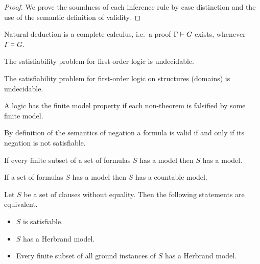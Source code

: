 \begin{proof}
	We prove the soundness of each inference rule by case distinction and the use of the semantic definition of validity.
\end{proof}



\begin{theorem}
	Natural deduction is a complete calculus,
	i.e.~a proof \( \Gamma\vdash G \) exists,
	whenever \( \Gamma\models G \).
\end{theorem}


\begin{theorem}
	The satisfiability problem for first-order logic is undecidable.
\end{theorem}

\begin{theorem}
	The satisfiability problem for first-order logic on  structures (domains) is undecidable.
\end{theorem}

\begin{definition}
	A logic has the finite model property if each non-theorem is falsified by some finite model.
\end{definition}

\begin{lemma}[Refutation]
	By definition of the semantics of negation a formula is valid if and only if its negation is not satisfiable.
\end{lemma}

\begin{theorem}\label{the:compactness}
	If every finite subset of a set of formulas \( S \) has a model then \( S \) has a model.
\end{theorem}

\begin{theorem}\label{the:loewenheim}
	If a set of formulas \( S \) has a model then \( S \) has a countable model.
\end{theorem}

\begin{theorem}[Herbrand, 1930]\label{the:herbrand}
	Let \( S \) be a set of clauses without equality. Then the following statements are equivalent.
	\begin{itemize}
		\item \( S \) is satisfiable.
		\item \( S \) has a Herbrand model.
		\item Every finite subset of all ground instances of \( S \) has a Herbrand model.
	\end{itemize}
\end{theorem}

